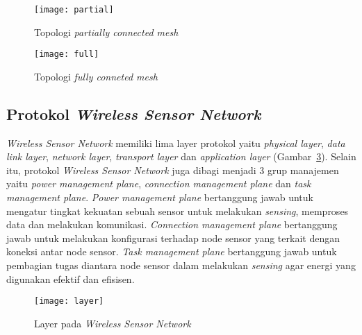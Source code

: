 \begin{itemize}
	\begin{figure}[H] 
		\centering  
		\texttt{[image: partial]}  
		\caption[Topologi \textit{partially connected mesh}]{Topologi \textit{partially connected mesh}}
		\label{fig:partial} 
	\end{figure}  
	
	\begin{figure}[H] 
		\centering  
		\texttt{[image: full]}  
		\caption[Topologi \textit{fully conneted mesh}]{Topologi \textit{fully conneted mesh}}
		\label{fig:full} 
	\end{figure}  
	
\end{itemize}
	
\subsection{Protokol \textit{Wireless Sensor Network}}
\label{protokol}
\textit{Wireless Sensor Network} memiliki lima layer protokol yaitu \textit{physical layer}, \textit{data link layer}, \textit{network layer}, \textit{transport layer} dan \textit{application layer} (Gambar~\ref{fig:layer}). Selain itu, protokol \textit{Wireless Sensor Network} juga dibagi menjadi 3 grup manajemen yaitu \textit{power management plane}, \textit{connection management plane} dan \textit{task management plane}. \textit{Power management plane} bertanggung jawab untuk mengatur tingkat kekuatan sebuah sensor untuk melakukan \textit{sensing}, memproses data dan melakukan komunikasi. \textit{Connection management plane} bertanggung jawab untuk melakukan konfigurasi terhadap node sensor yang terkait dengan koneksi antar node sensor. \textit{Task management plane} bertanggung jawab untuk pembagian tugas diantara node sensor dalam melakukan \textit{sensing} agar energi yang digunakan efektif dan efisisen.

\begin{figure}[H] 
		\centering  
		\texttt{[image: layer]}  
		\caption[Layer pada \textit{Wireless Sensor Network}]{Layer pada \textit{Wireless Sensor Network}}
		\label{fig:layer} 
	\end{figure}
	
